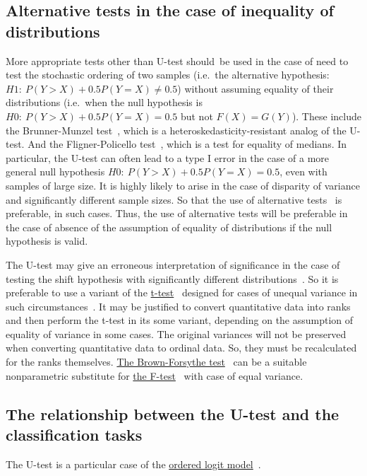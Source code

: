 \documentclass[]{scrreprt}
\begin{document}
\subsection{Alternative tests in the case of inequality of distributions}
More appropriate tests other than U-test should~be used in the case of need to test the stochastic ordering of two samples (i.e.~the alternative hypothesis: $H1:\ P(Y>X)+0.5P(Y=X)\neq0.5$) without assuming equality of their distributions (i.e.~when the null hypothesis is~$H0:\ P(Y>X)+0.5P(Y=X)=0.5$ but not $F(X)=G(Y)$).  These include the Brunner-Munzel test~\cite{Bruner-Munzel-test-1}, which is a heteroskedasticity-resistant analog of the U-test. And the Fligner-Policello test~\cite{Fligner-Policello-test}, which is a test for equality of medians. In particular, the U-test can often lead to a type I error in the case of a more general null hypothesis $H0:\ P(Y>X)+0.5P(Y=X)=0.5$, even with samples of large size. It is highly likely to arise in the case of disparity of variance and significantly different sample sizes. So that the use of alternative tests~\cite{U-test-vs-Bruner-Munzel-test} is preferable, in such cases. Thus, the use of alternative tests will be preferable in the case of absence of the assumption of equality of distributions if the null hypothesis is valid.

The U-test may give an erroneous interpretation of significance in the case of testing the shift hypothesis with significantly different distributions~\cite{U-test-unequal-variance}. So it is preferable to use a variant of the \href{https://en.wikipedia.org/wiki/Welch's_t-test}{t-test}~\cite{Welch-t-test} designed for cases of unequal variance in such circumstances~\cite{U-test-unequal-variance}. It may be justified to convert quantitative data into ranks and then perform the t-test in its some variant, depending on the assumption of equality of variance in some cases. The original variances will not be preserved when converting quantitative data to ordinal data. So, they must be recalculated for the ranks themselves. \href{https://en.wikipedia.org/wiki/Brown-Forsythe_test}{The Brown-Forsythe test}~\cite{Brown-Forsythe-test} can be a suitable nonparametric substitute for \href{https://en.wikipedia.org/wiki/F-test}{the F-test}~\cite{F-test} with case of equal variance.
%
\subsection{The relationship between the U-test and the classification tasks}\label{U-test&classification}
The U-test is a particular case of the \href{https://en.wikipedia.org/wiki/Ordered_logit}{ordered logit model}~\cite{Ordered-logit}.
%
\end{document}
